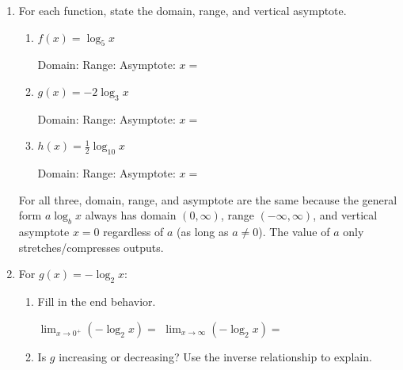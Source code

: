 \documentclass[10pt]{article}
\begin{document}
\namedateperiod

\vspace{0.1in}

\begin{enumerate}[leftmargin=1.8em, itemsep=14pt]

\item For each function, state the domain, range, and vertical asymptote.

\begin{enumerate}[leftmargin=1.5em, itemsep=10pt, label=\alph*.]
  \item $f(x) = \log_5 x$

  \vspace{4pt}
  Domain:  \quad Range: \ans{$(-\infty,\infty)$} \quad Asymptote: $x = $ 

  \item $g(x) = -2\log_3 x$

  \vspace{4pt}
  Domain:  \quad Range: \ans{$(-\infty,\infty)$} \quad Asymptote: $x = $ 

  \item $h(x) = \tfrac{1}{2}\log_{10} x$

  \vspace{4pt}
  Domain:  \quad Range: \ans{$(-\infty,\infty)$} \quad Asymptote: $x = $ 
\end{enumerate}

\begin{teachernote}
For all three, domain, range, and asymptote are the same because the general form $a\log_b x$
always has domain $(0,\infty)$, range $(-\infty,\infty)$, and vertical asymptote $x=0$
regardless of $a$ (as long as $a \ne 0$). The value of $a$ only stretches/compresses outputs.
\end{teachernote}

\item For $g(x) = -\log_2 x$:

\begin{enumerate}[leftmargin=1.5em, itemsep=8pt, label=\alph*.]
  \item Fill in the end behavior.

  \vspace{4pt}
  $\displaystyle\lim_{x \to 0^+} (-\log_2 x) = $ \ans{$+\infty$} \qquad
  $\displaystyle\lim_{x \to \infty} (-\log_2 x) = $ \ans{$-\infty$}

  \item Is $g$ increasing or decreasing? Use the inverse relationship to explain.


\end{enumerate}
\end{enumerate}
\end{document}
